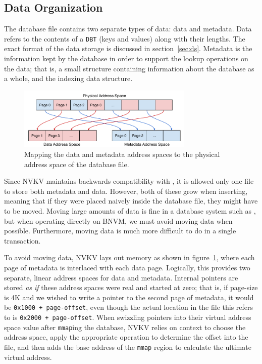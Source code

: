 \subsection{Data Organization}

The database file contains two separate types of data: data and metadata. Data
refers to the contents of a \texttt{DBT} (keys and values) along with their
lengths. The exact format of the data storage is discussed in
section~\ref{sec:ds}. Metadata is the information kept by the database in order
to support the lookup operations on the data; that is, a small structure
containing information about the database as a whole, and the indexing data
structure.

\begin{figure}
\centering
\hspace*{-0.1in}
\includegraphics[width=84mm]{fig/addrspace}
\caption{Mapping the data and metadata address spaces to the physical address
space of the database file.}
\label{fig:addrspace}
\end{figure}

Since NVKV maintains backwards compatibility with \bdb, it is allowed only one file to
store both metadata and data. However, both of these grow when inserting,
meaning that if they were placed naively inside the database file, they might
have to be moved. Moving large amounts of data is fine in a database system
such as \bdb, but when operating directly on BNVM, we must avoid moving data
when possible. Furthermore, moving data is much more difficult to do in a single
transaction.

To avoid moving data, NVKV lays out memory as shown in
figure~\ref{fig:addrspace}, where each page of metadata is interlaced with each
data page. Logically, this provides two separate, linear address spaces for data
and metadata. Internal pointers are stored \textit{as if} these address spaces
were real and started at zero; that is, if page-size is 4K and we wished to
write a pointer to the second page of metadata, it would be \texttt{0x1000 +
page-offset}, even though the actual location in the file this refers to is
\texttt{0x2000 + page-offset}. When swizzling pointers into their virtual
address space value after \texttt{mmap}ing the database, NVKV relies on context
to choose the address space, apply the appropriate operation to determine the
offset into the file, and then adds the base address of the \texttt{mmap}
region to calculate the ultimate virtual address.

